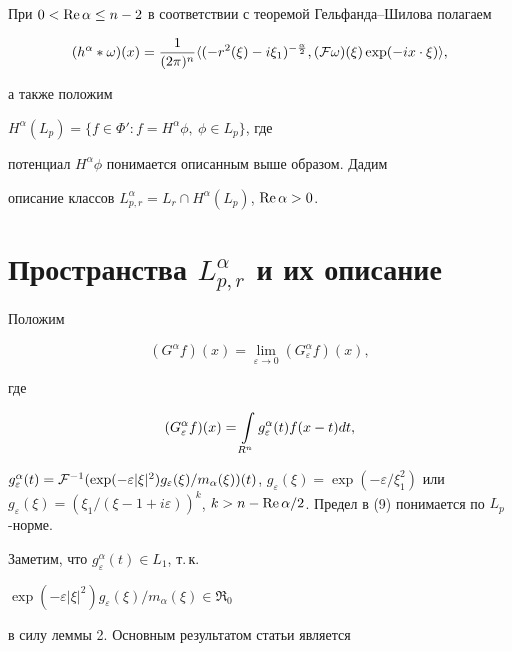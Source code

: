 При $0<\operatorname{Re}\alpha\leq n-2$ в соответствии с теоремой Гельфанда--Шилова полагаем


$$


(h^\alpha*\omega)(x)=\frac{1}{(2\pi)^n}\la (-r^2(\xi)-i\xi_1)^


{-\frac{\alpha}{2}},(\F\omega)(\xi)\exp(-ix\cdot\xi)\ra,


$$


а также положим


$H^\alpha(L_p)=\{f\in{\Phi}': f=H^\alpha\phi,\ \phi\in L_p\}$, где


потенциал $H^\alpha\phi$ понимается описанным выше образом. Дадим 


описание классов $L_{p,r}^{\alpha}=L_r\cap H^\alpha(L_p)$, $\operatorname{Re}\alpha>0$.








\section{Пространства $L_{p,r}^\alpha$ и их описание}





Положим


\begin{equation}


(G^\alpha f)(x)=\lim\limits_{\varepsilon\to 0}(G_\varepsilon^\alpha f)(x),


\end{equation}


где


$$


(G_\varepsilon^\alpha f)(x)=\Intr g^\alpha_\varepsilon(t)f(x-t)dt,


$$


$g^\alpha_\varepsilon(t)=\F^{-1}(\exp(-\varepsilon|\xi|^2)


g_\varepsilon(\xi)/m_\alpha(\xi))(t)$, $g_\varepsilon(\xi)=


\exp(-\varepsilon/\xi_1^2)$ или $g_\varepsilon(\xi)=(\xi_1/(\xi-1+


i\varepsilon))^k$, $k>n-\R\alpha/2$. Предел в (9) понимается по $L_p$-норме.


Заметим, что $g^\alpha_\varepsilon(t)\in L_1$, т.\,к.


$\exp(-\varepsilon|\xi|^2)g_\varepsilon(\xi)/m_\alpha(\xi)\in\Re_0$


в силу леммы 2. Основным результатом статьи является








